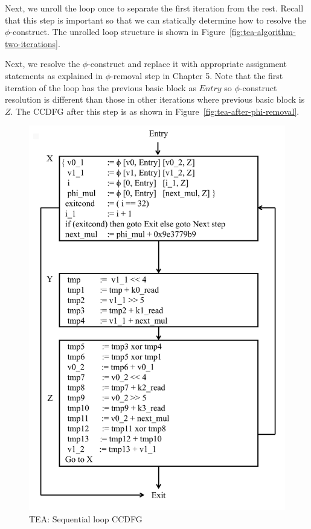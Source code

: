 Next, we unroll the loop once to separate the first iteration from the rest. Recall that this step is important so that we can statically determine how to resolve the 
$\phi$-construct. The unrolled loop structure is shown in Figure~\ref{fig:tea-algorithm-two-iterations}.

Next, we resolve the $\phi$-construct and replace it with appropriate assignment statements as explained in $\phi$-removal step in Chapter 5. Note that the
first iteration of the loop has the previous basic block as $Entry$ so $\phi$-construct resolution is different than those in other iterations where previous basic block is $Z$. The CCDFG after this step is as shown in Figure~\ref{fig:tea-after-phi-removal}.

\begin{figure}[H]
\begin{center}
\includegraphics[width=4.75in]{fig-proposal/tea-seq-ccdfg}
\caption{TEA: Sequential loop CCDFG}
\label{fig:tea-seq-loop-ccdfg}
\end{center}
\end{figure}

